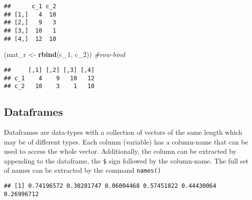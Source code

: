 \documentclass[11pt,]{article}
\newenvironment{Shaded}{\begin{snugshade}}{\end{snugshade}}
\newcommand{\KeywordTok}[1]{\textcolor[rgb]{0.13,0.29,0.53}{\textbf{#1}}}
\newcommand{\DataTypeTok}[1]{\textcolor[rgb]{0.13,0.29,0.53}{#1}}
\newcommand{\DecValTok}[1]{\textcolor[rgb]{0.00,0.00,0.81}{#1}}
\newcommand{\StringTok}[1]{\textcolor[rgb]{0.31,0.60,0.02}{#1}}
\newcommand{\CommentTok}[1]{\textcolor[rgb]{0.56,0.35,0.01}{\textit{#1}}}
\newcommand{\OperatorTok}[1]{\textcolor[rgb]{0.81,0.36,0.00}{\textbf{#1}}}
\newcommand{\NormalTok}[1]{#1}
\begin{document}
\begin{verbatim}
##      c_1 c_2
## [1,]   4  10
## [2,]   9   3
## [3,]  10   1
## [4,]  12  10
\end{verbatim}

\begin{Shaded}
\begin{Highlighting}[]
\NormalTok{(mat_r <-}\StringTok{ }\KeywordTok{rbind}\NormalTok{(c_}\DecValTok{1}\NormalTok{, c_}\DecValTok{2}\NormalTok{)) }\CommentTok{#row-bind}
\end{Highlighting}
\end{Shaded}

\begin{verbatim}
##     [,1] [,2] [,3] [,4]
## c_1    4    9   10   12
## c_2   10    3    1   10
\end{verbatim}

\subsection{Dataframes}\label{dataframes}

Dataframes are data-types with a collection of vectors of the same
length which may be of different types. Each column (variable) has a
column-name that can be used to access the whole vector. Additionally,
the column can be extracted by appending to the dataframe, the
\texttt{\$} sign followed by the column-name. The full set of names can
be extracted by the command \texttt{names()}

\begin{Shaded}
\end{Shaded}

\begin{verbatim}
## [1] 0.74196572 0.30281747 0.06004468 0.57451822 0.44430064 0.26996712
\end{verbatim}
\end{document}
